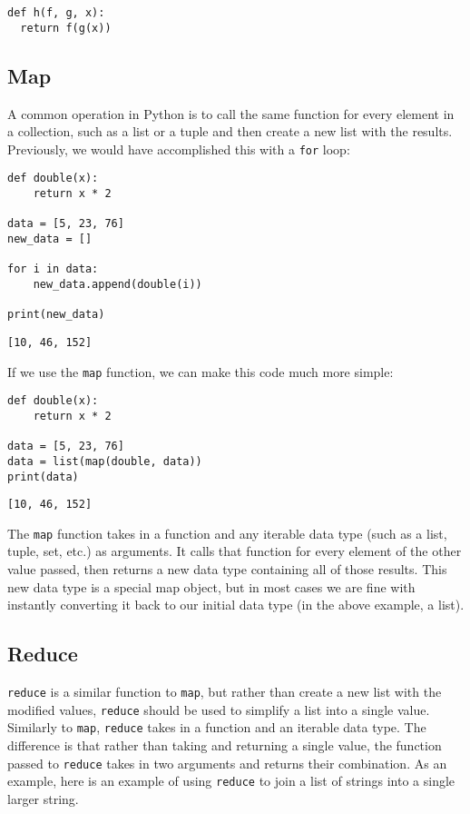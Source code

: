 \documentclass[11pt]{cselabheader}
\begin{document}
\begin{lstlisting}[style=python]
def h(f, g, x):
  return f(g(x))
\end{lstlisting}

\subsection{Map}
\label{subsec:map}
A common operation in Python is to call the same function for every element in a
collection, such as a list or a tuple and then create a new list with the
results. Previously, we would have accomplished this with a \lstinline{for}
loop:

\begin{lstlisting}[style=python]
def double(x):
    return x * 2

data = [5, 23, 76]
new_data = []

for i in data:
    new_data.append(double(i))

print(new_data)
\end{lstlisting}

\begin{lstlisting}[style=bash]
[10, 46, 152]
\end{lstlisting}

If we use the \lstinline{map} function, we can make this code much more simple:

\begin{lstlisting}[style=python]
def double(x):
    return x * 2

data = [5, 23, 76]
data = list(map(double, data))
print(data)
\end{lstlisting}

\begin{lstlisting}[style=bash]
[10, 46, 152]
\end{lstlisting}

The \lstinline{map} function takes in a function and any iterable data type
(such as a list, tuple, set, etc.) as arguments. It calls that function for
every element of the other value passed, then returns a new data type containing
all of those results. This new data type is a special map object, but in most
cases we are fine with instantly converting it back to our initial data type (in
the above example, a list).


\subsection{Reduce}
\label{subsec:reduce}
\lstinline{reduce} is a similar function to \lstinline{map}, but rather than
create a new list with the modified values, \lstinline{reduce} should be used to
simplify a list into a single value. Similarly to \lstinline{map},
\lstinline{reduce} takes in a function and an iterable data type. The difference
is that rather than taking and returning a single value, the function passed to
\lstinline{reduce} takes in two arguments and returns their combination. As an
example, here is an example of using \lstinline{reduce} to join a list of
strings into a single larger string.
\end{document}
